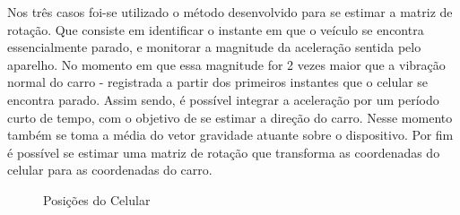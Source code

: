Nos três casos foi-se utilizado o método desenvolvido para se estimar a matriz de rotação. Que consiste em identificar o instante em que o veículo se encontra essencialmente parado, e monitorar a magnitude da aceleração sentida pelo aparelho. No momento em que essa magnitude for 2 vezes maior que a vibração normal do carro - registrada a partir dos primeiros instantes que o celular se encontra parado. Assim sendo, é possível integrar a aceleração por um período curto de tempo, com o objetivo de se estimar a direção do carro. Nesse momento também se toma a média do vetor gravidade atuante sobre o dispositivo. Por fim é possível se estimar uma matriz de rotação que transforma as coordenadas do celular para as coordenadas do carro.

\begin{figure}[h]
    \centering
    \hfill
    \hfill
    \caption{Posições do Celular}
    \label{fig:posicoesCelular}
\end{figure}{}

